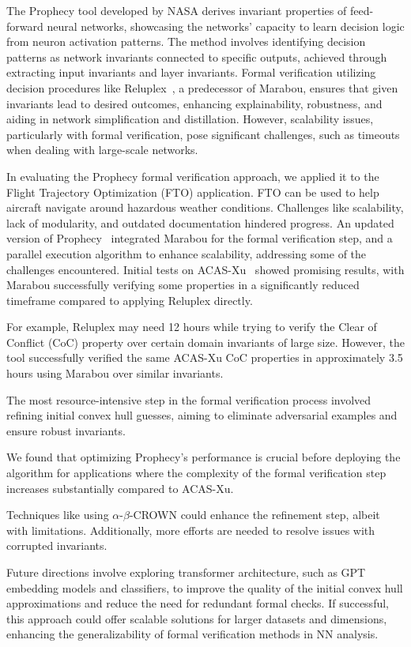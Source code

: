 The Prophecy tool developed by NASA\cite{Gopinath2019FindingII,8952519} derives invariant properties of feed-forward neural networks, showcasing the networks' capacity to learn decision logic from neuron activation patterns. The method involves identifying decision patterns as network invariants connected to specific outputs, achieved through extracting input invariants and layer invariants. Formal verification utilizing decision procedures like Reluplex~\cite{10.1007/s10703-021-00363-7}, a predecessor of Marabou, ensures that given invariants lead to desired outcomes, enhancing explainability, robustness, and aiding in network simplification and distillation. However, scalability issues, particularly with formal verification, pose significant challenges, such as timeouts when dealing with large-scale networks. 

In evaluating the Prophecy formal verification approach, we applied it to the Flight Trajectory Optimization (FTO) application.  FTO can be used to help aircraft navigate around hazardous weather conditions. 
Challenges like scalability, lack of modularity, and outdated documentation hindered progress. An updated version of Prophecy~\cite{safednn-nasa} integrated Marabou for the formal verification step, and a parallel execution algorithm to enhance scalability, addressing some of the challenges encountered. Initial tests on ACAS-Xu~\cite{10.1007/978-3-030-62822-2_4} showed promising results, with Marabou successfully verifying some properties in a significantly reduced timeframe compared to applying Reluplex directly. 

For example, Reluplex may need 12 hours while trying to verify the Clear of Conflict (CoC) property over certain domain invariants of large size. However, the tool successfully verified the same ACAS-Xu CoC properties in approximately 3.5 hours using Marabou over similar invariants.

The most resource-intensive step in the formal verification process involved refining initial convex hull guesses, aiming to eliminate adversarial examples and ensure robust invariants. 

We found that optimizing Prophecy's performance is crucial before deploying the algorithm for applications where the complexity of the formal verification step increases substantially compared to ACAS-Xu.

Techniques like using $\alpha$-$\beta$-CROWN could enhance the refinement step, albeit with limitations. %
Additionally, more efforts are needed to resolve issues with corrupted invariants.


Future directions involve exploring transformer architecture, such as GPT embedding models\cite{GPT4} and classifiers, to improve the quality of the initial convex hull approximations and reduce the need for redundant formal checks. If successful, this approach could offer scalable solutions for larger datasets and dimensions, enhancing the generalizability of formal verification methods in NN analysis.